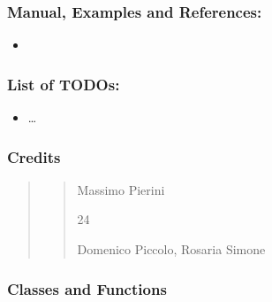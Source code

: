 \documentclass[letterpaper,10pt,english]{sphinxmanual}
\begin{document}
\subsubsection{Manual, Examples and References:}
\label{\detokenize{cubmods:id83}}\begin{itemize}
\item {} 
\sphinxAtStartPar
{}

\end{itemize}


\subsubsection{List of TODOs:}
\label{\detokenize{cubmods:id84}}\begin{itemize}
\item {} 
\sphinxAtStartPar
…

\end{itemize}


\subsubsection{Credits}
\label{\detokenize{cubmods:id85}}\begin{quote}
\begin{quote}\begin{description}
\sphinxAtStartPar
Massimo Pierini

\sphinxhyphen{}24

\sphinxAtStartPar
Domenico Piccolo, Rosaria Simone

\sphinxAtStartPar
{}

\end{description}\end{quote}
\end{quote}


\subsubsection{Classes and Functions}
\label{\detokenize{cubmods:id86}}
\end{document}
